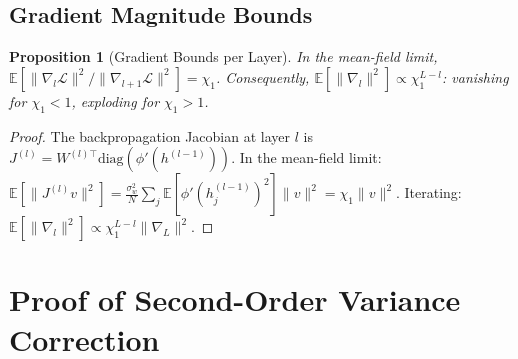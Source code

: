 \documentclass[10pt]{article}
\newcommand{\EE}{\mathbb{E}}
\newtheorem{proposition}[theorem]{Proposition}
\begin{document}
\subsection{Gradient Magnitude Bounds}

\begin{proposition}[Gradient Bounds per Layer]
\label{prop:gradient-bounds}
In the mean-field limit, $\EE[\|\nabla_l \mathcal{L}\|^2/\|\nabla_{l+1} \mathcal{L}\|^2] = \chi_1$.
Consequently, $\EE[\|\nabla_l\|^2] \propto \chi_1^{L-l}$: vanishing for $\chi_1 < 1$, exploding for $\chi_1 > 1$.
\end{proposition}

\begin{proof}
The backpropagation Jacobian at layer $l$ is $J^{(l)} = W^{(l)\top} \text{diag}(\phi'(h^{(l-1)}))$.
In the mean-field limit:
$\EE[\|J^{(l)} v\|^2] = \frac{\sigma_w^2}{N} \sum_j \EE[\phi'(h_j^{(l-1)})^2] \|v\|^2 = \chi_1 \|v\|^2$.
Iterating: $\EE[\|\nabla_l\|^2] \propto \chi_1^{L-l} \|\nabla_L\|^2$.
\end{proof}

\section{Proof of Second-Order Variance Correction}
\label{app:second-order-proof}
\end{document}
